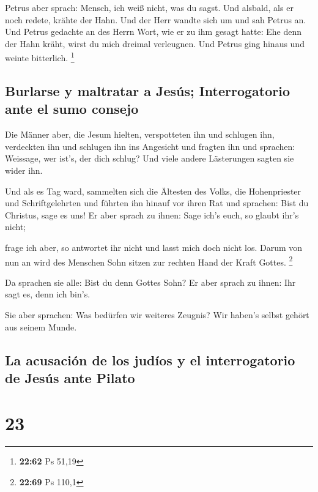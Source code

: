  Petrus aber sprach: Mensch, ich weiß nicht, was du
sagst. Und alsbald, als er noch redete, krähte der Hahn. 
Und der Herr wandte sich um und sah Petrus an. Und Petrus gedachte an
des Herrn Wort, wie er zu ihm gesagt hatte: Ehe denn der Hahn kräht,
wirst du mich dreimal verleugnen.  Und Petrus ging hinaus
und weinte bitterlich. \footnote{\textbf{22:62} Ps 51,19}

\hypertarget{burlarse-y-maltratar-a-jesuxfas-interrogatorio-ante-el-sumo-consejo}{%
\subsection{Burlarse y maltratar a Jesús; Interrogatorio ante el sumo
consejo}\label{burlarse-y-maltratar-a-jesuxfas-interrogatorio-ante-el-sumo-consejo}}

 Die Männer aber, die Jesum hielten, verspotteten ihn und
schlugen ihn,  verdeckten ihn und schlugen ihn ins
Angesicht und fragten ihn und sprachen: Weissage, wer ist's, der dich
schlug?  Und viele andere Lästerungen sagten sie wider
ihn.

 Und als es Tag ward, sammelten sich die Ältesten des
Volks, die Hohenpriester und Schriftgelehrten und führten ihn hinauf vor
ihren Rat  und sprachen: Bist du Christus, sage es uns!
Er aber sprach zu ihnen: Sage ich's euch, so glaubt ihr's nicht;

 frage ich aber, so antwortet ihr nicht und lasst mich
doch nicht los.  Darum von nun an wird des Menschen Sohn
sitzen zur rechten Hand der Kraft Gottes. \footnote{\textbf{22:69} Ps
  110,1}

 Da sprachen sie alle: Bist du denn Gottes Sohn? Er aber
sprach zu ihnen: Ihr sagt es, denn ich bin's.

 Sie aber sprachen: Was bedürfen wir weiteres Zeugnis?
Wir haben's selbst gehört aus seinem Munde.

\hypertarget{la-acusaciuxf3n-de-los-juduxedos-y-el-interrogatorio-de-jesuxfas-ante-pilato}{%
\subsection{La acusación de los judíos y el interrogatorio de Jesús ante
Pilato}\label{la-acusaciuxf3n-de-los-juduxedos-y-el-interrogatorio-de-jesuxfas-ante-pilato}}

\hypertarget{section-22}{%
\section{23}\label{section-22}}

